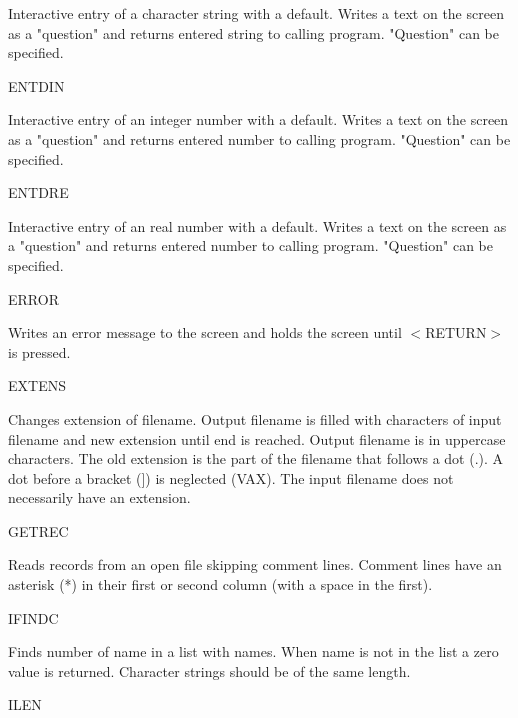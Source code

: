 \documentclass[11pt]{article}
\begin{document}
\begin{indenting}{2.54cm}
Interactive entry of a character string with a default. Writes a text on the
screen as a "question" and returns entered string to calling program.
"Question" can be specified.
\end{indenting}
ENTDIN
\testlastline

\begin{indenting}{2.54cm}
Interactive entry of an integer number with a default. Writes a text on the
screen as a "question" and returns entered number to calling program.
"Question" can be specified.
\end{indenting}

\bigskip
ENTDRE
\testlastline

\begin{indenting}{2.54cm}
Interactive entry of an real number with a default. Writes a text on the
screen as a "question" and returns entered number to calling program.
"Question" can be specified.
\end{indenting}
ERROR
\testlastline

\begin{indenting}{2.54cm}
Writes an error message to the screen and holds the screen until $<$RE\-TURN$>$ is pressed.
\end{indenting}
EXTENS
\testlastline

\begin{indenting}{2.54cm}
Changes extension of filename. Output filename is filled with characters of
input filename and new extension until end is reached. Output filen\-ame is
in uppercase characters. The old extension is the part of the filename that
follows a dot (.). A dot before a bracket (]) is neglected (VAX). The input
filename does not necessarily have an extension.
\end{indenting}
GETREC
\testlastline

\begin{indenting}{2.54cm}
Reads records from an open file skipping comment lines. Comment lines
have an asterisk (*) in their first or second column (with a space in the
first).
\end{indenting}
IFINDC
\testlastline

\begin{indenting}{2.54cm}
Finds number of name in a list with names. When name is not in the list a
zero value is returned. Character strings should be of the same length.
\end{indenting}
ILEN
\testlastline
\end{document}
